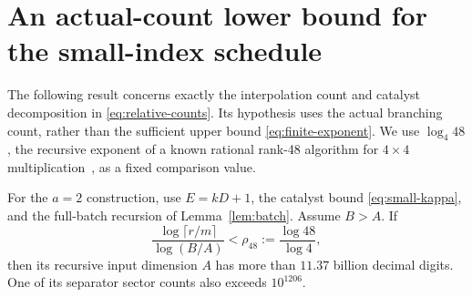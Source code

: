 \section{An actual-count lower bound for the small-index schedule}
\label{subsec:obstruction}

The following result concerns exactly the interpolation count and catalyst
decomposition in \eqref{eq:relative-counts}. Its hypothesis uses the
actual branching count, rather than the sufficient upper bound
\eqref{eq:finite-exponent}.
We use \(\log_4 48\), the recursive exponent of a known rational
rank-48 algorithm for \(4\times4\) multiplication~\citep{Dumas26},
as a fixed comparison value.

\begin{proposition}\label{prop:obstruction}
For the \(a=2\) construction, use \(E=kD+1\), the catalyst bound
\eqref{eq:small-kappa}, and the full-batch recursion of
Lemma~\ref{lem:batch}. Assume \(B>A\). If
\[
 \frac{\log\lceil r/m\rceil}{\log(B/A)}
 <\rho_{48}:=\frac{\log48}{\log4},
\]
then its recursive input dimension \(A\) has more than
\(11.37\) billion decimal digits. One of its separator sector counts
also exceeds \(10^{1206}\).
\end{proposition}
